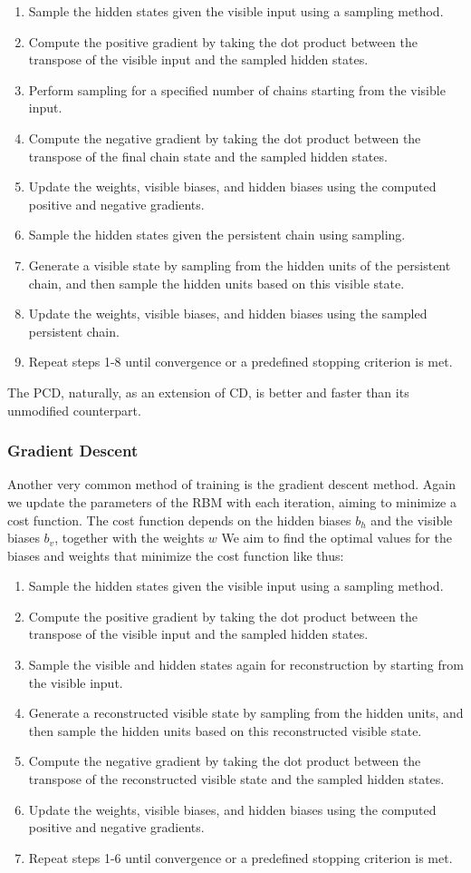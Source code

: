 \documentclass{article}
\begin{document}
\begin{enumerate}
\item Sample the hidden states given the visible input using a sampling method.
\item Compute the positive gradient by taking the dot product between the transpose of the visible input and the sampled hidden states.
\item Perform sampling for a specified number of chains starting from the visible input.
\item Compute the negative gradient by taking the dot product between the transpose of the final chain state and the sampled hidden states.
\item Update the weights, visible biases, and hidden biases using the computed positive and negative gradients.
\item Sample the hidden states given the persistent chain using sampling.
\item Generate a visible state by sampling from the hidden units of the persistent chain, and then sample the hidden units based on this visible state.
\item Update the weights, visible biases, and hidden biases using the sampled persistent chain.
\item Repeat steps 1-8 until convergence or a predefined stopping criterion is met.
\end{enumerate}
The PCD, naturally, as an extension of CD, is better and faster than its unmodified counterpart. 
\newpage
\subsubsection{Gradient Descent}
Another very common method of training is the gradient descent method. Again we update the parameters of the RBM with each iteration, aiming to minimize a cost function. The cost function depends on the hidden biases $b_h$ and the visible biases $b_v$, together with the weights $w$
\newline
We aim to find the optimal values for the biases and weights that minimize the cost function like thus:
\begin{enumerate}
\item Sample the hidden states given the visible input using a sampling method.
\item Compute the positive gradient by taking the dot product between the transpose of the visible input and the sampled hidden states.
\item Sample the visible and hidden states again for reconstruction by starting from the visible input.
\item Generate a reconstructed visible state by sampling from the hidden units, and then sample the hidden units based on this reconstructed visible state.
\item Compute the negative gradient by taking the dot product between the transpose of the reconstructed visible state and the sampled hidden states.
\item Update the weights, visible biases, and hidden biases using the computed positive and negative gradients.
\item Repeat steps 1-6 until convergence or a predefined stopping criterion is met.
\end{enumerate}
\end{document}
